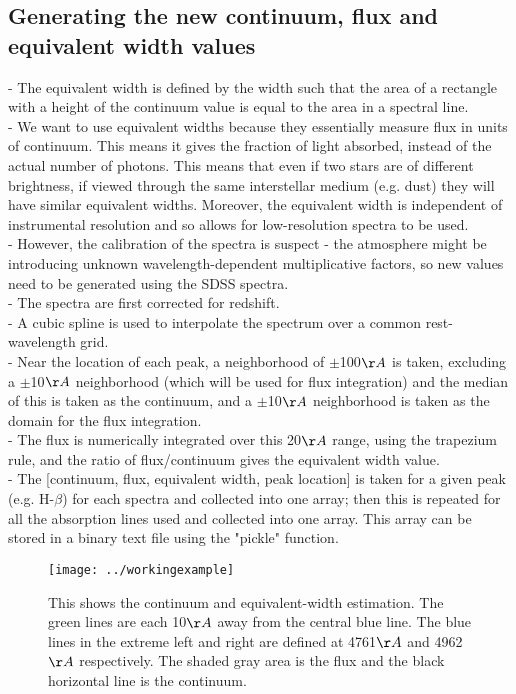 \documentclass[12pt]{article}
\begin{document}
\subsection{Generating the new continuum, flux and equivalent width values}
- The equivalent width is defined by the width such that the area of a rectangle with a height of the continuum value is equal to the area in a spectral line.\\
- We want to use equivalent widths because they essentially measure flux in units of continuum. This means it gives the fraction of light absorbed, instead of the actual number of photons. This means that even if two stars are of different brightness, if viewed through the same interstellar medium (e.g. dust) they will have similar equivalent widths. Moreover, the equivalent width is independent of instrumental resolution and so allows for low-resolution spectra to be used.\\
- However, the calibration of the spectra is suspect - the atmosphere might be introducing unknown wavelength-dependent multiplicative factors, so new values need to be generated using the SDSS spectra.\\
- The spectra are first corrected for redshift.\\
- A cubic spline is used to interpolate the spectrum over a common rest-wavelength grid.\\
- Near the location of each peak, a neighborhood of $\pm$100$\AA$ is taken, excluding a $\pm$10$\AA$ neighborhood (which will be used for flux integration) and the median of this is taken as the continuum, and a $\pm$10$\AA$ neighborhood is taken as the domain for the flux integration.\\
- The flux is numerically integrated over this 20$\AA$ range, using the trapezium rule, and the ratio of flux/continuum gives the equivalent width value.\\
- The [continuum, flux, equivalent width, peak location] is taken for a given peak (e.g. H-$\beta$) for each spectra and collected into one array; then this is repeated for all the absorption lines used and collected into one array. This array can be stored in a binary text file using the "pickle" function. \\
\begin{figure}
\texttt{[image: ../workingexample]}\\
\caption{This shows the continuum and equivalent-width estimation. The green lines are each 10$\AA$  away from the central blue line. The blue lines in the extreme left and right are defined at 4761$\AA$ and 4962$\AA$  respectively. The shaded gray area is the flux and the black horizontal line is the continuum.}
\end{figure}
\end{document}
